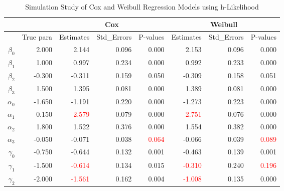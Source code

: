 \begin{table}[ht]
\centering
\caption{Simulation Study of Cox and Weibull Regression Models using h-Likelihood}
\begin{tabular}{rr|rrr|rrr}
  \hline
   & & \multicolumn{3}{c|}{Cox} &  \multicolumn{3}{c}{Weibull} \\
  \hline
   & True para & Estimates & Std\_Errors & P-values & Estimates & Std\_Errors & P-values \\ 
  \hline
  $\beta_0$ & 2.000 & 2.144 & 0.096  & 0.000 & 2.153 & 0.096  & 0.000 \\ 
  $\beta_1$ & 1.000 & 0.997 & 0.234 & 0.000 & 0.992 & 0.233 & 0.000 \\ 
  $\beta_2$ & -0.300 & -0.311 & 0.159  & 0.050 & -0.309 & 0.158  & 0.051 \\ 
  $\beta_3$ & 1.500 & 1.395 & 0.081  & 0.000 & 1.389 & 0.081  & 0.000 \\ 
  \hline
  $\alpha_0$ & -1.650 & -1.191 & 0.220  & 0.000 & -1.273 & 0.223  & 0.000 \\ 
  $\alpha_1$ & 0.150 & \textcolor{red}{2.579} & 0.079  & 0.000 & \textcolor{red}{2.751} & 0.076  & 0.000 \\ 
  $\alpha_2$ & 1.800 & 1.522 & 0.376 & 0.000 & 1.554 & 0.382 & 0.000 \\ 
  $\alpha_3$ & -0.050 & -0.071 & 0.038  & \textcolor{red}{0.064} & -0.066 & 0.039  & \textcolor{red}{0.089} \\ 
  \hline
  $\gamma_0$ & -0.750 & -0.644 & 0.132  & 0.001 & -0.463 & 0.139  & 0.001 \\ 
  $\gamma_1$ & -1.500 & \textcolor{red}{-0.614} & 0.134  & 0.015 & \textcolor{red}{-0.310} & 0.240  & \textcolor{red}{0.196} \\ 
  $\gamma_2$ & -2.000 & \textcolor{red}{-1.561} & 0.162 & 0.004 & \textcolor{red}{-1.008} & 0.135  & 0.000 \\ 
   \hline
\end{tabular}
\label{tbl:siml}
\end{table}





